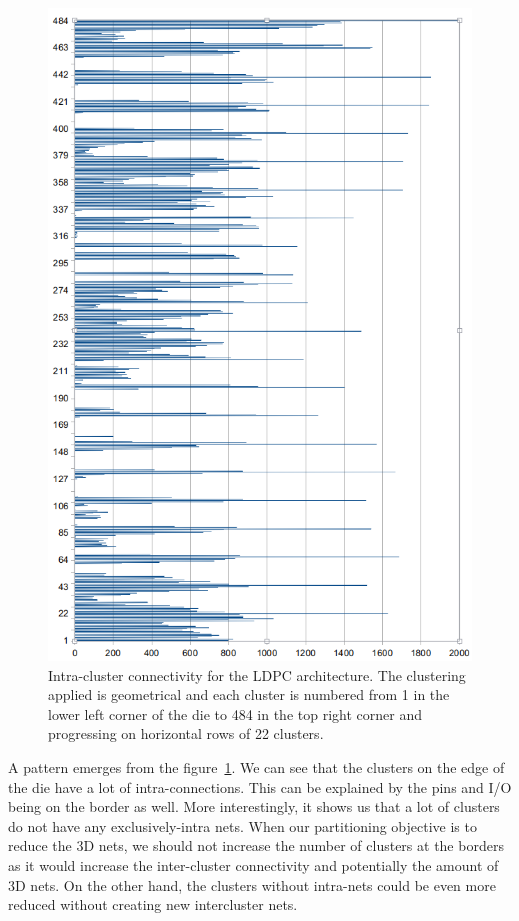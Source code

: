 \documentclass[11pt,a4paper]{report} %
\theoremstyle{customdef}
\begin{document}
\begin{figure}[!h]
\centering
\includegraphics[width=.8\textwidth]{img/intra-clust-con}
\caption{Intra-cluster connectivity for the LDPC architecture. The clustering applied is geometrical and each cluster is numbered from 1 in the lower left corner of the die to 484 in the top right corner and progressing on horizontal rows of 22 clusters.}
\label{fig:intra-clust-con}
\end{figure}

A pattern emerges from the figure~\ref{fig:intra-clust-con}.
We can see that the clusters on the edge of the die have a lot of intra-connections.
This can be explained by the pins and I/O being on the border as well.
More interestingly, it shows us that a lot of clusters do not have any exclusively-intra nets.
When our partitioning objective is to reduce the 3D nets, we should not increase the number of clusters at the borders as it would increase the inter-cluster connectivity and potentially the amount of 3D nets.
On the other hand, the clusters without intra-nets could be even more reduced without creating new intercluster nets.
\end{document}
